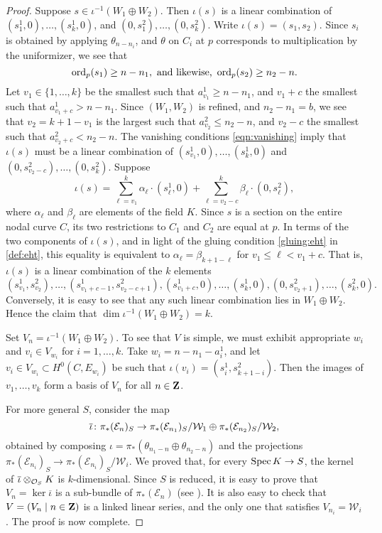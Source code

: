 \begin{proof}
  Suppose $s \in \iota^{-1}(W_1 \oplus W_2)$.
  Then $\iota(s)$ is a linear combination of $(s^1_1,0), \dots, (s^1_k, 0)$, and $(0, s^2_1), \dots, (0,s^2_k)$.
  Write $\iota(s) = (s_1, s_2)$.
  Since $s_i$ is obtained by applying $\theta_{n-n_i}$, and $\theta$ on $C_i$ at $p$ corresponds to multiplication by the uniformizer, we see that
  \begin{equation}\label{eqn:vanishing}
    \operatorname{ord}_p(s_1) \geq n - n_1, \text{ and likewise, } \operatorname{ord}_p(s_2) \geq n_2 - n.
  \end{equation}
  Let $v_1 \in \{1, \dots, k\}$ be the smallest such that $a^1_{v_1} \geq n-n_1$, and $v_1+c$ the smallest such that $a^1_{v_1+c} > n-n_1$.
  Since $(W_1, W_2)$ is refined, and $n_2 - n_1 = b$, we see that $v_2 = k+1-v_1$ is the largest such that $a^2_{v_2} \leq n_2 - n$, and $v_2 - c$ the smallest such that $a^2_{v_2 + c} < n_2 - n$.
  The vanishing conditions \eqref{eqn:vanishing} imply that $\iota(s)$ must be a linear combination of $(s^1_{v_1},0), \dots, (s^1_k,0)$ and $(0, s^2_{v_2-c}), \dots,  (0,s^2_k)$.
  Suppose
  \[ \iota(s) = \sum_{\ell = v_1}^k \alpha_{\ell} \cdot (s^1_\ell,0) + \sum_{\ell = v_2-c}^{k} \beta_\ell \cdot (0,s^2_\ell),\]
  where $\alpha_{\ell}$ and $\beta_{\ell}$ are elements of the field $K$.
  Since $s$ is a section on the entire nodal curve $C$, its two restrictions to $C_1$ and $C_2$ are equal at $p$.
  In terms of the two components of $\iota(s)$, and in light of the gluing condition \eqref{gluing:eht} in \autoref{def:eht}, this equality is equivalent to $\alpha_{\ell} = \beta_{k+1-\ell}$ for $v_1 \leq \ell < v_1+c$.
  That is, $\iota(s)$ is a linear combination of the $k$ elements 
  \[ (s^1_{v_1} , s^2_{v_2}), \dots, (s^1_{v_1+c-1} , s^2_{v_2-c+1}), (s^1_{v_1+c},0), \dots, (s^1_k,0), (0,s^2_{v_2+1}), \dots, (s^2_{k},0).\]  
  Conversely, it is easy to see that any such linear combination lies in $W_1 \oplus W_2$.
  Hence the claim that $\dim \iota^{-1}(W_1 \oplus W_2) = k$.

  Set $V_n = \iota^{-1}(W_1 \oplus W_2)$.
  To see that $V$ is simple, we must exhibit appropriate $w_i$ and $v_i \in V_{w_i}$ for $i = 1, \dots, k$.
  Take $w_i = n-n_1-a^1_i$, and let $v_i \in V_{w_i} \subset H^0(C, E_{w_i})$ be such that $\iota(v_i) = (s^1_i, s^2_{k+1-i})$.
  Then the images of $v_1, \dots, v_k$ form a basis of $V_n$ for all $n \in {\bf Z}$.

  For more general $S$, consider the map
  \[ \overline \iota {\colon} \pi_* (\mathcal E_n)_S \to \pi_*(\mathcal E_{n_1})_S / \mathcal W_1 \oplus \pi_*(\mathcal E_{n_2})_S / \mathcal W_2,\]
  obtained by composing $\iota = \pi_*(\theta_{n_1-n} \oplus \theta_{n_2-n})$ and the projections $\pi_*(\mathcal E_{n_i})_S \to \pi_*(\mathcal E_{n_i})_S / \mathcal W_i$.
  We proved that, for every $\operatorname{Spec} K \to S$, the kernel of $\overline \iota \otimes_{\mathcal O_S} K$ is $k$-dimensional.
  Since $S$ is reduced, it is easy to prove that $V_n = \ker \overline \iota$ is a sub-bundle of $\pi_*(\mathcal E_n)$ (see \cite[B.3.4 with reduced $B$]{oss:14}).
  It is also easy to check that $V = (V_n \mid n \in {\bf Z})$ is a linked linear series, and the only one that satisfies $V_{n_i} = \mathcal W_i$.
  The proof is now complete.
\end{proof}

